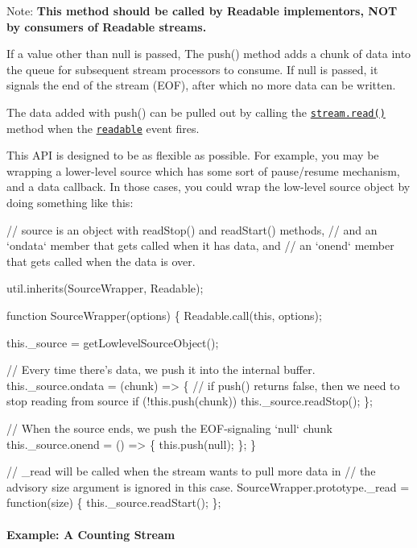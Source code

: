 Note\+: {\bfseries This method should be called by Readable implementors, N\+OT by consumers of Readable streams.}

If a value other than null is passed, The {\ttfamily push()} method adds a chunk of data into the queue for subsequent stream processors to consume. If {\ttfamily null} is passed, it signals the end of the stream (E\+OF), after which no more data can be written.

The data added with {\ttfamily push()} can be pulled out by calling the \href{#stream_readable_read_size}{\tt {\ttfamily stream.\+read()}} method when the \href{#stream_event_readable}{\tt {\ttfamily \textquotesingle{}readable\textquotesingle{}}} event fires.

This A\+PI is designed to be as flexible as possible. For example, you may be wrapping a lower-\/level source which has some sort of pause/resume mechanism, and a data callback. In those cases, you could wrap the low-\/level source object by doing something like this\+:


\begin{DoxyCode}
// source is an object with readStop() and readStart() methods,
// and an `ondata` member that gets called when it has data, and
// an `onend` member that gets called when the data is over.

util.inherits(SourceWrapper, Readable);

function SourceWrapper(options) \{
  Readable.call(this, options);

  this.\_source = getLowlevelSourceObject();

  // Every time there's data, we push it into the internal buffer.
  this.\_source.ondata = (chunk) => \{
    // if push() returns false, then we need to stop reading from source
    if (!this.push(chunk))
      this.\_source.readStop();
  \};

  // When the source ends, we push the EOF-signaling `null` chunk
  this.\_source.onend = () => \{
    this.push(null);
  \};
\}

// \_read will be called when the stream wants to pull more data in
// the advisory size argument is ignored in this case.
SourceWrapper.prototype.\_read = function(size) \{
  this.\_source.readStart();
\};
\end{DoxyCode}


\paragraph*{Example\+: A Counting Stream}

